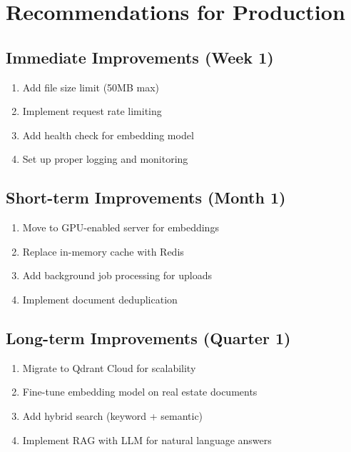 \documentclass[11pt,a4paper]{article}
\begin{document}
\section{Recommendations for Production}

\subsection{Immediate Improvements (Week 1)}

\begin{enumerate}
    \item Add file size limit (50MB max)
    \item Implement request rate limiting
    \item Add health check for embedding model
    \item Set up proper logging and monitoring
\end{enumerate}

\subsection{Short-term Improvements (Month 1)}

\begin{enumerate}
    \item Move to GPU-enabled server for embeddings
    \item Replace in-memory cache with Redis
    \item Add background job processing for uploads
    \item Implement document deduplication
\end{enumerate}

\subsection{Long-term Improvements (Quarter 1)}

\begin{enumerate}
    \item Migrate to Qdrant Cloud for scalability
    \item Fine-tune embedding model on real estate documents
    \item Add hybrid search (keyword + semantic)
    \item Implement RAG with LLM for natural language answers
\end{enumerate}
\end{document}
